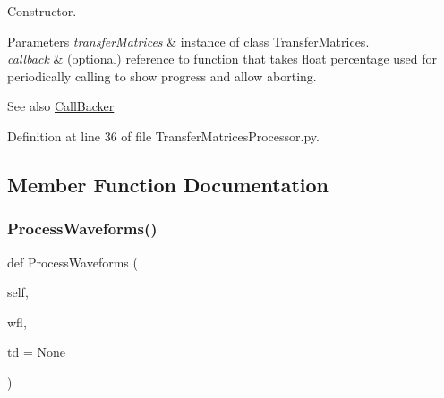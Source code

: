 Constructor. 


\begin{DoxyParams}{Parameters}
{\em transfer\+Matrices} & instance of class Transfer\+Matrices. \\
\hline
{\em callback} & (optional) reference to function that takes float percentage used for periodically calling to show progress and allow aborting. \\
\hline
\end{DoxyParams}
\begin{DoxySeeAlso}{See also}
\hyperlink{namespaceSignalIntegrity_1_1CallBacker}{Call\+Backer} 
\end{DoxySeeAlso}


Definition at line 36 of file Transfer\+Matrices\+Processor.\+py.



\subsection{Member Function Documentation}
\mbox{\label{classSignalIntegrity_1_1TimeDomain_1_1Filters_1_1TransferMatricesProcessor_1_1TransferMatricesProcessor_a407999013bef4f9b70aae3375dc839c9}} 
\subsubsection{\texorpdfstring{Process\+Waveforms()}{ProcessWaveforms()}}
{\footnotesize\ttfamily def Process\+Waveforms (\begin{DoxyParamCaption}\item[{}]{self,  }\item[{}]{wfl,  }\item[{}]{td = {\ttfamily None} }\end{DoxyParamCaption})}



